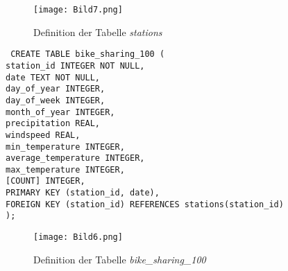 \documentclass[a4paper, 12pt]{article}
\begin{document}
\vspace{\baselineskip} 

\begin{figure}[H]
    \centering
    \texttt{[image: Bild7.png]}
    \par Definition der Tabelle \textit{stations}
\end{figure} 

{\fontsize{10}{12}\selectfont
\texttt{%
CREATE TABLE bike\_sharing\_100 ( \\
    station\_id INTEGER NOT NULL, \\
    date TEXT NOT NULL, \\
    day\_of\_year INTEGER, \\
    day\_of\_week INTEGER, \\
    month\_of\_year INTEGER, \\
    precipitation REAL, \\
    windspeed REAL, \\
    min\_temperature INTEGER, \\
    average\_temperature INTEGER, \\
    max\_temperature INTEGER, \\
    {[}COUNT{]} INTEGER, \\
    PRIMARY KEY (station\_id, date), \\
    FOREIGN KEY (station\_id) REFERENCES stations(station\_id) \\
);
}} 
\\
\begin{figure}[H]
    \centering
    \texttt{[image: Bild6.png]}
    \par Definition der Tabelle \textit{bike\_sharing\_100}
\end{figure}

\newpage
\end{document}
